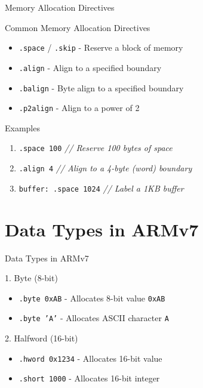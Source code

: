 \documentclass[aspectratio=169]{beamer}
\begin{document}
\begin{frame}{Memory Allocation Directives}
    \begin{block}{Common Memory Allocation Directives}
    \begin{itemize}
    \item \texttt{.space} / \texttt{.skip} - Reserve a block of memory
    \item \texttt{.align} - Align to a specified boundary
    \item \texttt{.balign} - Byte align to a specified boundary
    \item \texttt{.p2align} - Align to a power of 2
    \end{itemize}
    \end{block}
    \begin{exampleblock}{Examples}
    \begin{enumerate}
    \item \texttt{.space 100} \hfill \textit{// Reserve 100 bytes of space}
    \item \texttt{.align 4} \hfill \textit{// Align to a 4-byte (word) boundary}
    \item \texttt{buffer: .space 1024} \hfill \textit{// Label a 1KB buffer}
    \end{enumerate}
    \end{exampleblock}
\end{frame}

\section{Data Types in ARMv7}
\begin{frame}
    \sectionpage
\end{frame}

\begin{frame}{Data Types in ARMv7}
\begin{block}{1. Byte (8-bit)}
\begin{itemize}
    \item \texttt{.byte 0xAB} - Allocates 8-bit value \texttt{0xAB}
    \item \texttt{.byte 'A'} - Allocates ASCII character \texttt{A}
\end{itemize}
\end{block}

\begin{block}{2. Halfword (16-bit)}
\begin{itemize}
    \item \texttt{.hword 0x1234} - Allocates 16-bit value
    \item \texttt{.short 1000} - Allocates 16-bit integer
\end{itemize}
\end{block}
\end{frame}
\end{document}
